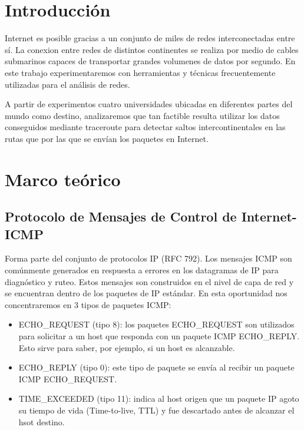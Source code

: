 \section{Introducción}

Internet es posible gracias a un conjunto de miles de redes interconectadas entre sí.
La conexion entre redes de distintos continentes se realiza por medio de cables submarinos capaces de transportar grandes volumenes de datos por segundo.
En este trabajo experimentaremos con herramientas y técnicas frecuentemente utilizadas para el análisis de redes.

A partir de experimentos cuatro universidades ubicadas en diferentes partes del mundo como destino, analizaremos que tan factible resulta utilizar los datos conseguidos mediante traceroute para detectar saltos intercontinentales en las rutas que por las que se envían los paquetes en Internet.  




\section{Marco teórico}

\subsection{Protocolo de Mensajes de Control de Internet- ICMP}

Forma parte del conjunto de protocolos IP (RFC 792). 
Los mensajes ICMP son comúnmente generados en respuesta a errores en los datagramas de IP para diagnóstico y ruteo. Estos mensajes son construidos en el nivel de capa de red y se encuentran dentro de los paquetes de IP estándar.
En esta oportunidad nos concentraremos en 3 tipos de paquetes ICMP:
\begin{itemize}
 \item ECHO\_REQUEST (tipo 8): los paquetes ECHO\_REQUEST son utilizados para solicitar a un host que responda con un paquete ICMP ECHO\_REPLY. Esto sirve para saber, por ejemplo, si un host es alcanzable.
 \item ECHO\_REPLY (tipo 0): este tipo de paquete se envía al recibir un paquete ICMP ECHO\_REQUEST.
 \item TIME\_EXCEEDED (tipo 11): indica al host origen que un paquete IP agoto su tiempo de vida (Time-to-live, TTL) y fue descartado antes de alcanzar el hsot destino.
\end{itemize}


